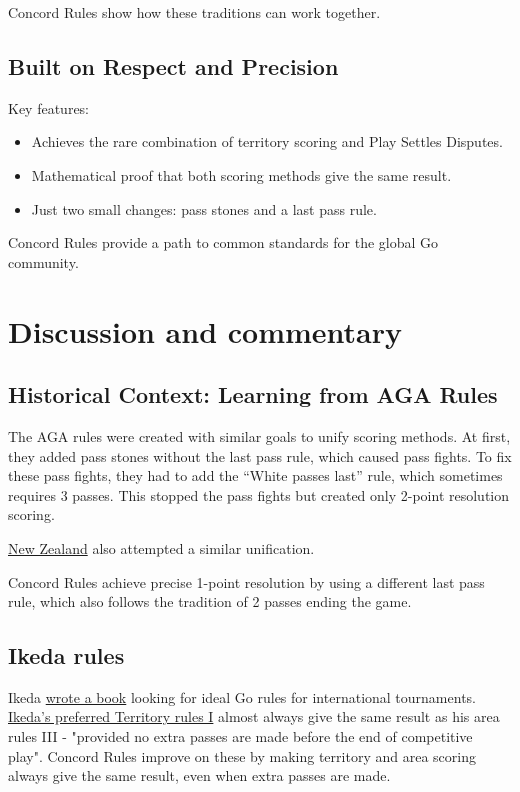 \documentclass[11pt]{article}
\begin{document}
Concord Rules show how these traditions can work together.

\subsection*{Built on Respect and Precision}

Key features:

\begin{itemize}
\item Achieves the rare combination of territory scoring and Play Settles Disputes.
\item Mathematical proof that both scoring methods give the same result.
\item Just two small changes: pass stones and a last pass rule.
\end{itemize}

Concord Rules provide a path to common standards for the global Go community.

\newpage
\section*{Discussion and commentary}

\subsection*{Historical Context: Learning from AGA Rules}

The AGA rules were created with similar goals to unify scoring methods.
At first, they added pass stones without the last pass rule, which caused pass fights.
To fix these pass fights, they had to add the ``White passes last'' rule, which sometimes requires 3 passes.
This stopped the pass fights but created only 2-point resolution scoring.

\href{https://go.org.nz/index.php/about-go/history-of-nz-rules-of-go}{New Zealand} also attempted a similar unification.

Concord Rules achieve precise 1-point resolution by using a different last pass rule, which also follows the tradition of 2 passes ending the game.

\subsection*{Ikeda rules}
Ikeda \href{https://gobase.org/studying/rules/ikeda/}{wrote a book} looking for ideal Go rules for international tournaments.
\href{https://gobase.org/studying/rules/ikeda/?sec=e_rules}{Ikeda's preferred Territory rules I} almost always give the same result as his area rules III
- "provided no extra passes are made before the end of competitive play".
Concord Rules improve on these by making territory and area scoring always give the same result, even when extra passes are made.
\end{document}

